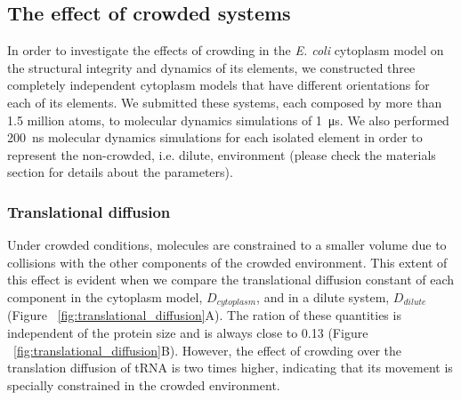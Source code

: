 \documentclass[journal=jacsat,manuscript=article]{achemso}
\begin{document}
\subsection{The effect of crowded systems}

In order to investigate the effects of crowding in the \textit{E. coli} cytoplasm model on the structural integrity and dynamics of its elements, we constructed three completely independent cytoplasm models that have different orientations for each of its elements. We submitted these systems, each composed by more than 1.5 million atoms, to molecular dynamics simulations of \SI{1}{\micro\second}. We also performed \SI{200}{\nano\second} molecular dynamics simulations for each isolated element in order to represent the non-crowded, i.e. dilute, environment (please check the materials section for details about the parameters).









\subsubsection{Translational diffusion}

Under crowded conditions, molecules are constrained to a smaller volume due to collisions with the other components of the crowded environment. This extent of this effect is evident when we compare the translational diffusion constant of each component in the cytoplasm model, $D_{cytoplasm}$, and in a dilute system, $D_{dilute}$ (Figure ~\ref{fig:translational_diffusion}A). The ration of these quantities is independent of the protein size and is always close to 0.13 (Figure ~\ref{fig:translational_diffusion}B). However, the effect of crowding over the translation diffusion of tRNA is two times higher, indicating that its movement is specially constrained in the crowded environment.
\end{document}
